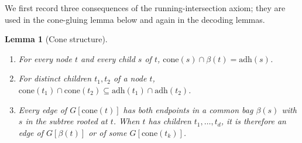 \documentclass[11pt]{article}
\newtheorem{lemma}[theorem]{Lemma}
\theoremstyle{definition}
\newcommand{\adh}{\mathrm{adh}}
\newcommand{\cone}{\mathrm{cone}}
\begin{document}
We first record three consequences of the running-intersection axiom; they are
used in the cone-gluing lemma below and again in the decoding lemmas.

\begin{lemma}[Cone structure]\label{lem:cone-struct}
\begin{enumerate}[label=\textup{(\roman*)}]
  \item For every node \(t\) and every child \(s\) of \(t\),
    \(\cone(s)\cap\beta(t)=\adh(s)\).
  \item For distinct children \(t_1,t_2\) of a node \(t\),
    \(\cone(t_1)\cap\cone(t_2)\subseteq\adh(t_1)\cap\adh(t_2)\).
  \item Every edge of \(G[\cone(t)]\) has both endpoints in a common bag
    \(\beta(s)\) with \(s\) in the subtree rooted at \(t\).  When \(t\) has children
    \(t_1,\ldots,t_d\), it is therefore an edge of \(G[\beta(t)]\) or of some
    \(G[\cone(t_k)]\).
\end{enumerate}
\end{lemma}
\end{document}
